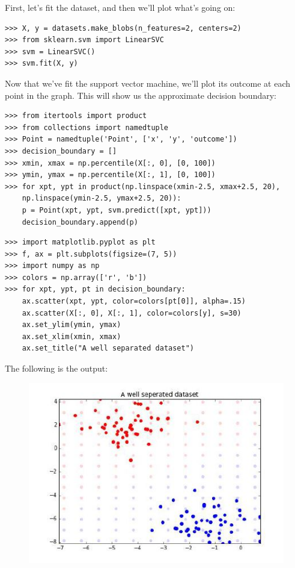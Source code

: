 \documentclass[SKL-MASTER.tex]{subfiles}
\begin{document}
First, let's fit the dataset, and then we'll plot what's going on:
\begin{framed}
\begin{verbatim}
>>> X, y = datasets.make_blobs(n_features=2, centers=2)
>>> from sklearn.svm import LinearSVC
>>> svm = LinearSVC()
>>> svm.fit(X, y)
\end{verbatim}
\end{framed}
Now that we've fit the support vector machine, we'll plot its outcome at each point in the
graph. This will show us the approximate decision boundary:
\begin{framed}
\begin{verbatim}
>>> from itertools import product
>>> from collections import namedtuple
>>> Point = namedtuple('Point', ['x', 'y', 'outcome'])
>>> decision_boundary = []
>>> xmin, xmax = np.percentile(X[:, 0], [0, 100])
>>> ymin, ymax = np.percentile(X[:, 1], [0, 100])
>>> for xpt, ypt in product(np.linspace(xmin-2.5, xmax+2.5, 20),
    np.linspace(ymin-2.5, ymax+2.5, 20)):
    p = Point(xpt, ypt, svm.predict([xpt, ypt]))
    decision_boundary.append(p)
\end{verbatim}
\end{framed}
\begin{framed}
\begin{verbatim}
>>> import matplotlib.pyplot as plt
>>> f, ax = plt.subplots(figsize=(7, 5))
>>> import numpy as np
>>> colors = np.array(['r', 'b'])
>>> for xpt, ypt, pt in decision_boundary:
    ax.scatter(xpt, ypt, color=colors[pt[0]], alpha=.15)
    ax.scatter(X[:, 0], X[:, 1], color=colors[y], s=30)
    ax.set_ylim(ymin, ymax)
    ax.set_xlim(xmin, xmax)
    ax.set_title("A well separated dataset")
\end{verbatim}
\end{framed}
The following is the output:
\begin{figure}
\centering
\includegraphics[width=0.7\linewidth]{images/SKL43-SVMs}
\caption{}
\label{fig:SKL43-SVMs}
\end{figure}
\end{document}
